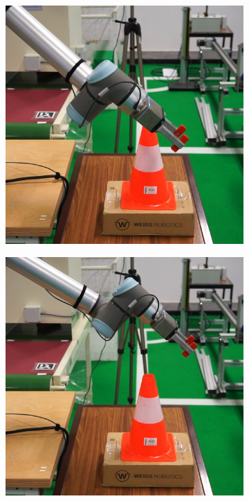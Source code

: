 \begin{figure}[h]
\begin{subfigure}{.2\linewidth}
    \end{subfigure}%
    \begin{subfigure}{.2\linewidth}
        \centering
        \includegraphics[width=.95\linewidth]{figs/chp6/col_real_2.jpg}
    \end{subfigure}%
    \begin{subfigure}{.2\linewidth}
        \centering
        \includegraphics[width=.95\linewidth]{figs/chp6/col_real_3.jpg}

\end{subfigure}
\end{figure}
